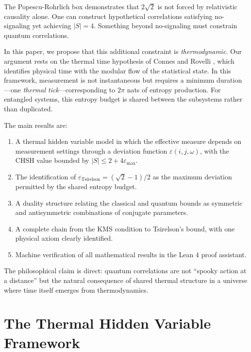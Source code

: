 \documentclass[12pt,a4paper]{article}
\newcommand{\eps}{\varepsilon}
\begin{document}
The Popescu-Rohrlich box \cite{PR1994} demonstrates that $2\sqrt{2}$ is not forced by relativistic causality alone. One can construct hypothetical correlations satisfying no-signaling yet achieving $|S| = 4$. Something beyond no-signaling must constrain quantum correlations.

In this paper, we propose that this additional constraint is \emph{thermodynamic}. Our argument rests on the thermal time hypothesis of Connes and Rovelli \cite{ConnesRovelli1994}, which identifies physical time with the modular flow of the statistical state. In this framework, measurement is not instantaneous but requires a minimum duration—one \emph{thermal tick}—corresponding to $2\pi$ nats of entropy production. For entangled systems, this entropy budget is shared between the subsystems rather than duplicated.

The main results are:

\begin{enumerate}
\item A thermal hidden variable model in which the effective measure depends on measurement settings through a deviation function $\eps(i,j,\omega)$, with the CHSH value bounded by $|S| \leq 2 + 4\eps_{\max}$.

\item The identification of $\eps_{\text{Tsirelson}} = (\sqrt{2}-1)/2$ as the maximum deviation permitted by the shared entropy budget.

\item A duality structure relating the classical and quantum bounds as symmetric and antisymmetric combinations of conjugate parameters.

\item A complete chain from the KMS condition to Tsirelson's bound, with one physical axiom clearly identified.

\item Machine verification of all mathematical results in the Lean 4 proof assistant.
\end{enumerate}

The philosophical claim is direct: quantum correlations are not ``spooky action at a distance'' but the natural consequence of shared thermal structure in a universe where time itself emerges from thermodynamics.

\section{The Thermal Hidden Variable Framework}
\end{document}
